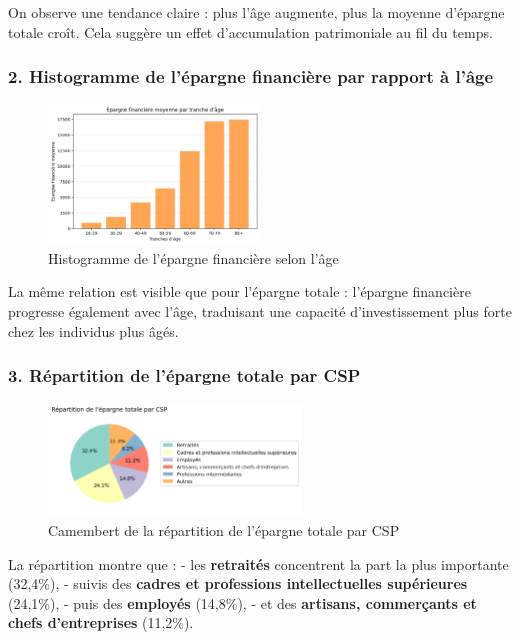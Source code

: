 On observe une tendance claire : plus l'âge augmente, plus la moyenne d'épargne totale croît.  
Cela suggère un effet d'accumulation patrimoniale au fil du temps.

\subsubsection*{2. Histogramme de l'épargne financière par rapport à l'âge}
\begin{figure}[!h]
    \centering
    \includegraphics[width=0.5\textwidth]{images/py/eparge_fin_age.png}
    \caption{Histogramme de l'épargne financière selon l'âge}
\end{figure}

La même relation est visible que pour l'épargne totale : l'épargne financière progresse également avec l'âge, traduisant une capacité d'investissement plus forte chez les individus plus âgés.

\newpage\subsubsection*{3. Répartition de l'épargne totale par CSP}
\begin{figure}[h]
    \centering
    \includegraphics[width=0.6\textwidth]{images/py/CSP_epargne.png}
    \caption{Camembert de la répartition de l'épargne totale par CSP}
\end{figure}

La répartition montre que :  
- les \textbf{retraités} concentrent la part la plus importante (32,4\%),  
- suivis des \textbf{cadres et professions intellectuelles supérieures} (24,1\%),  
- puis des \textbf{employés} (14,8\%),  
- et des \textbf{artisans, commerçants et chefs d'entreprises} (11,2\%).  

